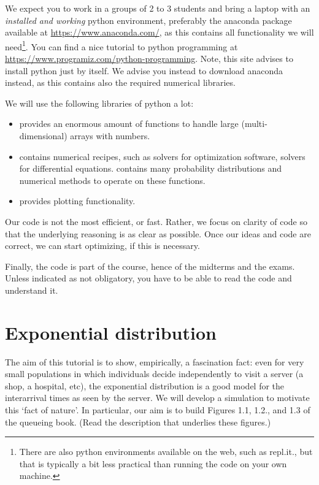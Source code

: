 \documentclass{scrartcl}
\begin{document}
We expect you to work in a groups of 2 to 3 students and bring a laptop with an \emph{installed and working} python environment, preferably  the anaconda package available at \url{https://www.anaconda.com/}, as this contains all functionality we will need\footnote{There are also python environments available on the web, such as repl.it., but that is typically a bit less practical than running the code on your own machine.}. You can find a nice tutorial to python programming at  \url{https://www.programiz.com/python-programming}. Note, this site advises to install python just by itself. We advise you instead to download anaconda instead, as this contains also the required numerical libraries. 

We will use the following libraries of python a lot:
\begin{itemize}
\item {}  provides an enormous amount of functions to handle large (multi-dimensional) arrays with numbers. 
\item {} contains numerical recipes, such as solvers for optimization software, solvers for differential equations.  contains many probability distributions and numerical methods to operate on these functions. 
\item {}  provides plotting functionality.
\end{itemize}

Our code is not the most efficient, or fast. Rather, we focus on clarity of code so that the underlying reasoning is as clear as possible. Once our ideas and code are correct, we can start optimizing, if this is necessary. 

Finally, the code is part of the course, hence of the midterms and the exams.  Unless indicated as not obligatory, you have to be able to read the code and understand it.


\section{Exponential distribution}

The aim of this tutorial is to show, empirically, a fascination fact: even for very small populations in which individuals decide independently to visit a server (a shop, a hospital, etc),  the  exponential distribution is a good model for the interarrival times as seen by the server.  We will develop a simulation to motivate this `fact of nature'.  In particular, our aim is to build Figures 1.1, 1.2., and 1.3 of the queueing book.  (Read the description that underlies these figures.)
\end{document}
